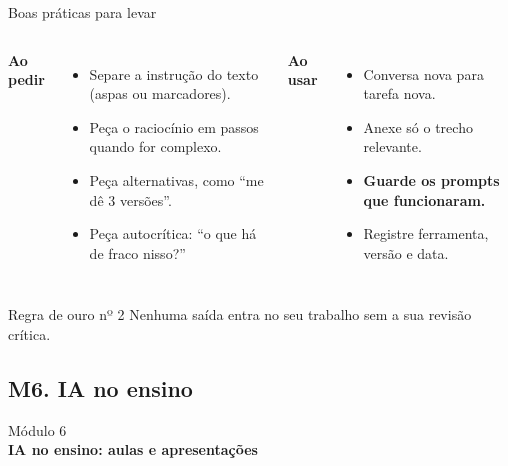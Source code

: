 \documentclass[11pt,aspectratio=169,t]{beamer}
\newcommand{\transicao}[2]{%
  \begin{frame}[plain]
    \centering
    \vspace*{2.2cm}
    {\large\color{cinzaescuro} #1}\\[0.8cm]
    {\Large\color{azulUNI}\textbf{#2}}
  \end{frame}}
\begin{document}
\begin{frame}{Boas práticas para levar}
  \small
  \begin{columns}[t]
    \textbf{Ao pedir}
    \begin{itemize}
      \item Separe a instrução do texto (aspas ou marcadores).
      \item Peça o raciocínio em passos quando for complexo.
      \item Peça alternativas, como ``me dê 3 versões''.
      \item Peça autocrítica: ``o que há de fraco nisso?''
    \end{itemize}
    \textbf{Ao usar}
    \begin{itemize}
      \item Conversa nova para tarefa nova.
      \item Anexe só o trecho relevante.
      \item \textbf{Guarde os prompts que funcionaram.}
      \item Registre ferramenta, versão e data.
    \end{itemize}
  \end{columns}
  \pause
  \vspace{0.25cm}
  \begin{alertblock}{Regra de ouro nº 2}
    \centering Nenhuma saída entra no seu trabalho sem a sua revisão crítica.
  \end{alertblock}
\end{frame}

\subsection{M6. IA no ensino}
\transicao{Módulo 6}{IA no ensino: aulas e apresentações}
\end{document}

